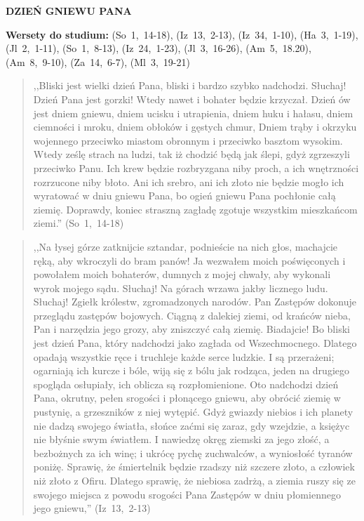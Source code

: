 \documentclass[10pt,a4paper,oneside]{article}
\begin{document}
\centerline{\textbf{\MakeUppercase{Dzień gniewu Pana}}}
\begin{center}
\textbf{Wersety do studium:} (So~1,~14-18), (Iz~13,~2-13), (Iz~34,~1-10), (Ha~3,~1-19), (Jl~2,~1-11), (So~1,~8-13), (Iz~24,~1-23), (Jl~3,~16-26), (Am~5,~18.20), (Am~8,~9-10), (Za~14,~6-7), (Ml~3,~19-21)
\end{center}
\begin{quote}
,,Bliski jest wielki dzień Pana, bliski i bardzo szybko nadchodzi. Słuchaj! Dzień Pana jest gorzki! Wtedy nawet i bohater będzie krzyczał. Dzień ów jest dniem gniewu, dniem ucisku i utrapienia, dniem huku i hałasu, dniem ciemności i mroku, dniem obłoków i gęstych chmur, Dniem trąby i okrzyku wojennego przeciwko miastom obronnym i przeciwko basztom wysokim. Wtedy ześlę strach na ludzi, tak iż chodzić będą jak ślepi, gdyż zgrzeszyli przeciwko Panu. Ich krew będzie rozbryzgana niby proch, a ich wnętrzności rozrzucone niby błoto. Ani ich srebro, ani ich złoto nie będzie mogło ich wyratować w dniu gniewu Pana, bo ogień gniewu Pana pochłonie całą ziemię. Doprawdy, koniec straszną zagładę zgotuje wszystkim mieszkańcom ziemi.'' (So~1,~14-18)
\end{quote}
\begin{quote}
,,Na łysej górze zatknijcie sztandar, podnieście na nich głos, machajcie ręką, aby wkroczyli do bram panów! Ja wezwałem moich poświęconych i powołałem moich bohaterów, dumnych z mojej chwały, aby wykonali wyrok mojego sądu. Słuchaj! Na górach wrzawa jakby licznego ludu. Słuchaj! Zgiełk królestw, zgromadzonych narodów. Pan Zastępów dokonuje przeglądu zastępów bojowych. Ciągną z dalekiej ziemi, od krańców nieba, Pan i narzędzia jego grozy, aby zniszczyć całą ziemię. Biadajcie! Bo bliski jest dzień Pana, który nadchodzi jako zagłada od Wszechmocnego. Dlatego opadają wszystkie ręce i truchleje każde serce ludzkie. I są przerażeni; ogarniają ich kurcze i bóle, wiją się z bólu jak rodząca, jeden na drugiego spogląda osłupiały, ich oblicza są rozpłomienione. Oto nadchodzi dzień Pana, okrutny, pełen srogości i płonącego gniewu, aby obrócić ziemię w pustynię, a grzeszników z niej wytępić. Gdyż gwiazdy niebios i ich planety nie dadzą swojego światła, słońce zaćmi się zaraz, gdy wzejdzie, a księżyc nie błyśnie swym światłem. I nawiedzę okręg ziemski za jego złość, a bezbożnych za ich winę; i ukrócę pychę zuchwalców, a wyniosłość tyranów poniżę. Sprawię, że śmiertelnik będzie rzadszy niż szczere złoto, a człowiek niż złoto z Ofiru. Dlatego sprawię, że niebiosa zadrżą, a ziemia ruszy się ze swojego miejsca z powodu srogości Pana Zastępów w dniu płomiennego jego gniewu,'' (Iz~13,~2-13)
\end{quote}
\end{document}

